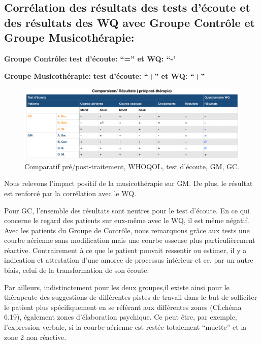   \subsection{Corrélation des résultats des tests d'écoute et des
    résultats des WQ avec Groupe Contrôle et
    Groupe Musicothérapie:}
\textbf{Groupe Contrôle:} 	          \textbf{ test d'écoute: ``=''   et    WQ: ``-'}


\textbf{Groupe Musicothérapie:}     \textbf{test d'écoute: ``+''      et    WQ: ``+''}


 \begin{figure}[th]
\centering
\includegraphics[width=1\linewidth]{images/graphiques/comparaison_pre_post.png}
\caption[Corrélation résultats pré/post]{Comparatif
  pré/post-traitement, WHOQOL, test d'écoute, GM, GC.}

\label{comparaison_pre_post}
\end{figure}



                Nous relevons l'impact positif de la
                musicothérapie sur GM.
                De plus, le résultat est renforcé par la corrélation
                avec le WQ.


                Pour GC, l'ensemble des résultats sont neutres pour le
                test d'écoute. En ce qui concerne le
                regard des patients sur eux-même avec le WQ, il est
                même négatif. Avec les patients du Groupe de
              Contrôle, nous remarquons grâce aux tests une courbe aérienne
              sans modification mais une courbe osseuse plus
              particulièrement réactive. Contrairement à
              ce que le patient pouvait ressentir ou estimer, il y a indication  et attestation d'une amorce de
              processus intérieur et ce, par un autre biais, celui de
              la transformation de son
              écoute.

 Par ailleurs, indistinctement pour les deux
 groupes,il existe ainsi pour le thérapeute des
 suggestions de différentes pistes de travail dans le but de
 solliciter le patient plus spécifiquement en se référant aux
              différentes zones (Cf.chéma 6.19), également zones
 d'élaboration psychique. Ce peut être, par exemple,
              l'expression verbale, si la courbe aérienne est restée
              totalement ``muette'' et la zone 2 non
              réactive.

